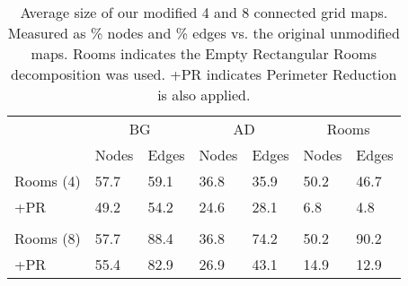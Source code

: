 \begin{table}[ht]
\caption{Average size of our modified 4 and 8 connected grid maps.
Measured as \% nodes and \% edges vs. the original unmodified maps.
Rooms indicates the Empty Rectangular Rooms decomposition was used.
+PR indicates Perimeter Reduction is also applied.}
\label{table-graphsize}
\begin{center}
\begin{tabular*}{\columnwidth}{p{1.8cm}m{0.62cm}m{0.62cm}m{0.62cm}m{0.62cm}m{0.62cm}m{0.62cm}}
  \hline
   & \multicolumn{2}{c}{BG} & \multicolumn{2}{c}{AD} & \multicolumn{2}{c}{Rooms}\\
	& Nodes & Edges & Nodes & Edges & Nodes & Edges \\
  \hline
%
Rooms (4) & 57.7 & 59.1 & 36.8 & 35.9 & 50.2 & 46.7 \\ 
+PR & 49.2 & 54.2 & 24.6 & 28.1 & 6.8 & 4.8 \\  \\
Rooms (8) & 57.7 & 88.4 & 36.8 & 74.2 & 50.2 & 90.2 \\ 
+PR & 55.4 & 82.9 & 26.9 & 43.1 & 14.9 & 12.9 \\ 

   \hline
\end{tabular*}
\end{center}
\end{table}

